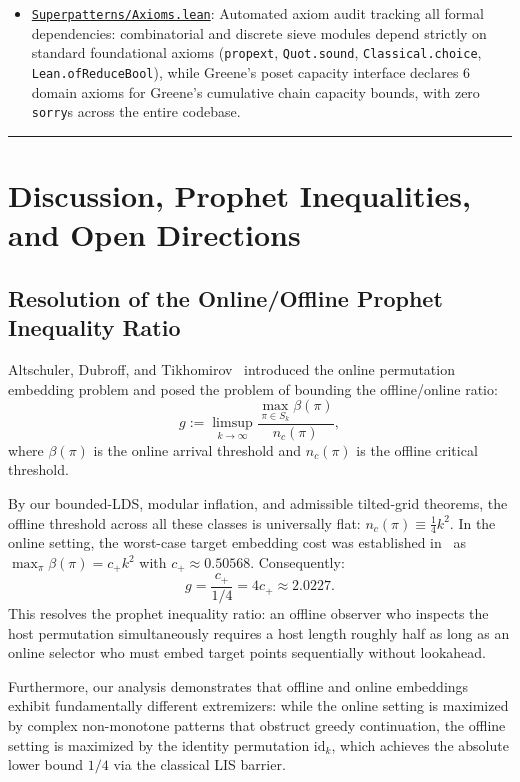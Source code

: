 \documentclass[
  11pt,
]{article}
\begin{document}
\begin{itemize}
\item
  \href{https://github.com/adamhadani/superpatterns/blob/main/formal-verification/lean/Superpatterns/Axioms.lean}{\texttt{Superpatterns/Axioms.lean}}:
  Automated axiom audit tracking all formal dependencies: combinatorial
  and discrete sieve modules depend strictly on standard foundational axioms
  (\texttt{propext}, \texttt{Quot.sound}, \texttt{Classical.choice},
  \texttt{Lean.ofReduceBool}), while Greene's poset capacity interface
  declares 6 domain axioms for Greene's cumulative chain capacity bounds, with
  zero \texttt{sorry}s across the entire codebase.
\end{itemize}

\begin{center}\rule{0.5\linewidth}{0.5pt}\end{center}

\section{Discussion, Prophet Inequalities, and Open Directions}\label{sec:discussion}

\subsection{Resolution of the Online/Offline Prophet Inequality Ratio}\label{sec:prophet-ratio}

Altschuler, Dubroff, and Tikhomirov~\cite{ref-ADT26} introduced the online permutation embedding problem and posed the problem of bounding the offline/online ratio:
\[
g := \limsup_{k \to \infty} \frac{\max_{\pi \in S_k} \beta(\pi)}{n_c(\pi)},
\]
where $\beta(\pi)$ is the online arrival threshold and $n_c(\pi)$ is the offline critical threshold.

By our bounded-LDS, modular inflation, and admissible tilted-grid theorems, the offline threshold across all these classes is universally flat: $n_c(\pi) \equiv \frac{1}{4} k^2$. In the online setting, the worst-case target embedding cost was established in~\cite{ref-ADT26} as $\max_\pi \beta(\pi) = c_+ k^2$ with $c_+ \approx 0.50568$. Consequently:
\[
g = \frac{c_+}{1/4} = 4 c_+ \approx 2.0227.
\]
This resolves the prophet inequality ratio: an offline observer who inspects the host permutation simultaneously requires a host length roughly half as long as an online selector who must embed target points sequentially without lookahead.

Furthermore, our analysis demonstrates that offline and online embeddings exhibit fundamentally different extremizers: while the online setting is maximized by complex non-monotone patterns that obstruct greedy continuation, the offline setting is maximized by the identity permutation $\mathrm{id}_k$, which achieves the absolute lower bound $1/4$ via the classical LIS barrier.
\end{document}
